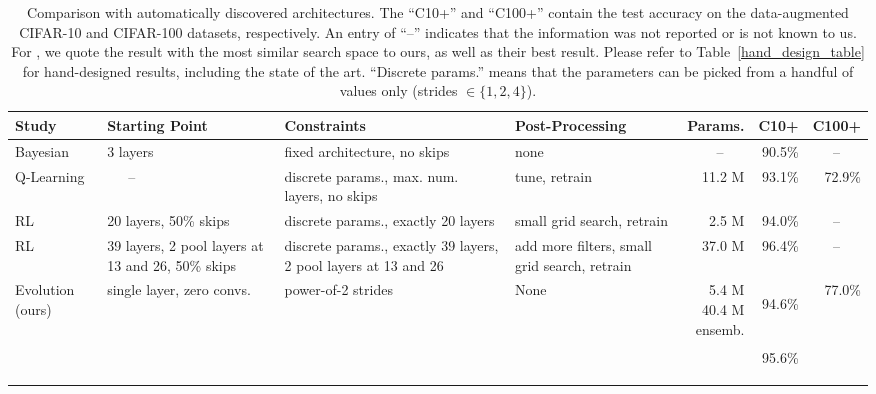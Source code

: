 \documentclass{article}
\renewcommand{\cite}[1]{\citep{#1}}
\newcommand{\bestacc}{94.6}
\newcommand{\bestparams}{5.4 M}
\newcommand{\onehundredacc}{77.0}
\newcommand{\onehundredparams}{40.4 M}
\newcommand{\ensembleparams}{ensemb.}
\newcommand{\ensembleacc}{95.6}
\begin{document}
\begin{table*}
\caption{Comparison with automatically discovered architectures. The ``C10+'' and ``C100+'' contain the test accuracy on the data-augmented CIFAR-10 and CIFAR-100 datasets, respectively. An entry of ``--'' indicates that the information was not reported or is not known to us. For \citet{zoph2016neural}, we quote the result with the most similar search space to ours, as well as their best result. Please refer to Table~\ref{hand_design_table} for hand-designed results, including the state of the art. ``Discrete params.'' means that the parameters can be picked from a handful of values only (\eg strides $\in\{1,2,4\}$).}
\label{automated_design_table}
\vskip 0.1in  \begin{center}
\begin{small}
\begin{sc}
\begin{tabular}{P{2.0 cm}P{2.7 cm}P{3.8 cm}P{2.8 cm}rrr}
\hline
\abovespace\belowspace
Study & Starting Point & Constraints & Post-Processing & Params. & C10+ & C100+ \\
\hline
\abovespace
Bayesian \cite{snoek2012practical} & 3 layers & fixed architecture, no skips & none & --~~~ & 90.5\% & --~~~ \\
\rule{0pt}{3ex}Q-Learning \cite{baker2016designing} & ~~~-- & discrete params., max. num. layers, no skips & tune, retrain & 11.2 M & 93.1\% & 72.9\% \\
\rule{0pt}{3ex}RL \cite{zoph2016neural} & 20 layers, 50\% skips & discrete params., exactly 20 layers & small grid search, retrain & 2.5 M & 94.0\% & --~~~ \\
\rule{0pt}{3ex}RL \cite{zoph2016neural} & 39 layers, 2 pool layers at 13 and 26, 50\% skips & discrete params., exactly 39 layers, 2 pool layers at 13 and 26 & add more filters, small grid search, retrain & 37.0 M & 96.4\% & --~~~ \\
\rule{0pt}{3ex}Evolution (ours) & single layer, zero convs. & power-of-2 strides & None & \parbox{1cm}{\vspace{0.2cm} \bestparams \\ \onehundredparams \\ \ensembleparams} & \parbox{1cm}{\vspace{0.2cm} \hfill \bestacc\% \\ \\ \parbox{1cm}{\hfill \ensembleacc\%} } & \parbox{1cm}{\vspace{0.2cm} \hfill \onehundredacc\%} \\
\end{tabular}
\end{sc}
\end{small}
\end{center}
\vskip -0.1in
\end{table*}
\end{document}

